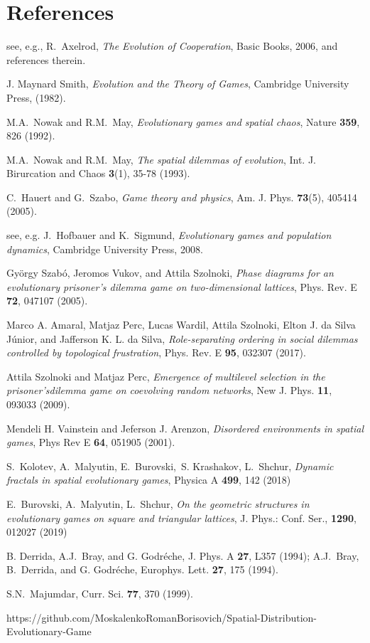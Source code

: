 \documentclass[a4paper]{jpconf}
\begin{document}
\section*{References}
\begin{thebibliography}{9}

 see, e.g., R.~Axelrod, \textit{The Evolution of Cooperation}, Basic Books,
2006, and references therein.

 J. Maynard Smith, \textit{Evolution and the Theory of Games},
Cambridge University Press, (1982).

 M.A.~Nowak and R.M.~May, \textit{Evolutionary games
and spatial chaos}, Nature \textbf{359}, 826 (1992).

 M.A.~Nowak and R.M.~May, \textit{The spatial
dilemmas of evolution}, Int. J. Birurcation and Chaos \textbf{3}(1), 35-78 (1993).

 C.~Hauert and G.~Szabo, \textit{Game theory and physics},
Am. J. Phys. \textbf{73}(5), 405414 (2005).

 see, e.g. J.~Hofbauer and K.~Sigmund, \textit{Evolutionary games and population dynamics}, Cambridge University Press, 2008.

 Gy\"{o}rgy Szab\'{o}, Jeromos Vukov, and Attila Szolnoki, \textit{Phase diagrams for an evolutionary prisoner’s dilemma game on two-dimensional lattices}, Phys. Rev. E \textbf{72}, 047107 (2005).

 Marco A. Amaral, Matjaz Perc,  Lucas Wardil, Attila Szolnoki, Elton J. da Silva J\'{u}nior, and Jafferson K. L. da Silva, \textit{Role-separating ordering in social dilemmas controlled by topological frustration}, Phys. Rev. E \textbf{95}, 032307 (2017).

 Attila Szolnoki and Matjaz Perc, \textit{Emergence of multilevel selection in the prisoner’sdilemma game on coevolving random networks}, New J. Phys. \textbf{11}, 093033 (2009).

  Mendeli H. Vainstein and Jeferson J. Arenzon, \textit{Disordered environments in spatial games}, Phys Rev E \textbf{64}, 051905 (2001).

 S.~Kolotev, A.~Malyutin, E.~Burovski,~S. Krashakov, L.~Shchur, \textit{Dynamic fractals in spatial evolutionary games}, Physica A  \textbf{499}, 142 (2018)

 E.~Burovski, A.~Malyutin, L.~Shchur, \textit{On the geometric structures in evolutionary games on square and triangular lattices}, J. Phys.: Conf. Ser., \textbf{1290}, 012027 (2019) 

 B. Derrida, A.J.~Bray, and G. Godr\'{e}che, J. Phys. A \textbf{27}, L357 (1994); A.J.~Bray, B.~Derrida, and G. Godr\'{e}che, Europhys. Lett. \textbf{27}, 175 (1994).

 S.N.~Majumdar, Curr. Sci. \textbf{77}, 370 (1999).

 https://github.com/MoskalenkoRomanBorisovich/Spatial-Distribution-Evolutionary-Game 


\end{thebibliography}
\end{document}
